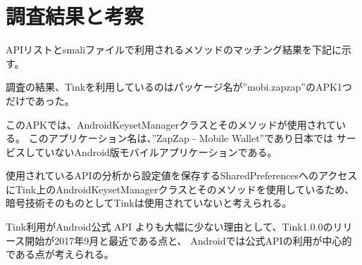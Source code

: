 \newpage
\section{調査結果と考察}

APIリストとsmaliファイルで利用されるメソッドのマッチング結果を下記に示す。

調査の結果、Tinkを利用しているのはパッケージ名が”mobi.zapzap”のAPK1つだけであった。

このAPKでは、AndroidKeysetManagerクラスとそのメソッドが使用されている。
このアプリケーション名は、”ZapZap - Mobile Wallet”\cite{ZapZap}であり日本では
サービスしていないAndroid版モバイルアプリケーションである。

使用されているAPIの分析から設定値を保存するSharedPreferencesへのアクセスにTink上のAndroidKeysetManagerクラスとそのメソッドを使用しているため、
暗号技術そのものとしてTinkは使用されていないと考えられる。

Tink利用がAndroid公式 API よりも大幅に少ない理由として、Tink1.0.0のリリース開始が2017年9月と最近である点と、
Androidでは公式APIの利用が中心的である点が考えられる。





